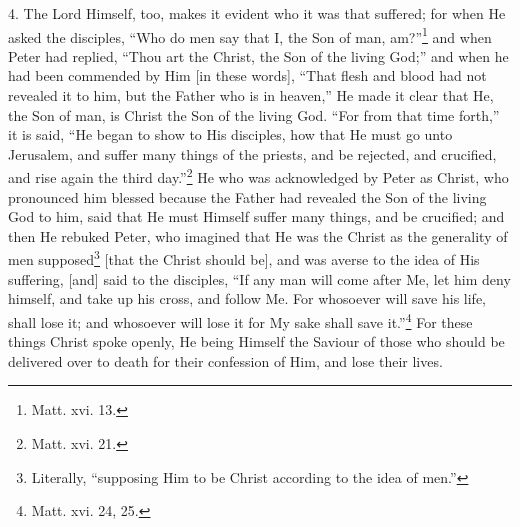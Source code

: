 4. The Lord Himself, too, makes it evident who it was that suffered; for when He asked the disciples, “Who do men say that I, the Son of man, am?”\footnote{Matt. xvi. 13.} and when Peter had replied, “Thou art the Christ, the Son of the living God;” and when he had been commended by Him [in these words], “That flesh and blood had not revealed it to him, but the Father who is in heaven,” He made it clear that He, the Son of man, is Christ the Son of the living God. “For from that time forth,” it is said, “He began to show to His disciples, how that He must go unto Jerusalem,  and suffer many things of the priests, and be rejected, and crucified, and rise again the third day.”\footnote{Matt. xvi. 21.} He who was acknowledged by Peter as Christ, who pronounced him blessed because the Father had revealed the Son of the living God to him, said that He must Himself suffer many things, and be crucified; and then He rebuked Peter, who imagined that He was the Christ as the generality of men supposed\footnote{Literally, “supposing Him to be Christ according to the idea of men.”} [that the Christ should be], and was averse to the idea of His suffering, [and] said to the disciples, “If any man will come after Me, let him deny himself, and take up his cross, and follow Me. For whosoever will save his life, shall lose it; and whosoever will lose it for My sake shall save it.”\footnote{Matt. xvi. 24, 25.} For these things Christ spoke openly, He being Himself the Saviour of those who should be delivered over to death for their confession of Him, and lose their lives.

